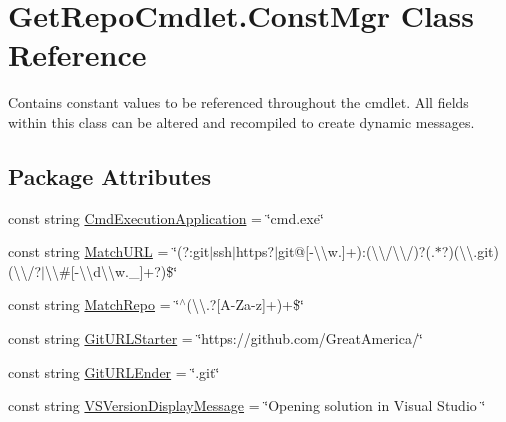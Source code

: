 \hypertarget{class_get_repo_cmdlet_1_1_const_mgr}{}\section{Get\+Repo\+Cmdlet.\+Const\+Mgr Class Reference}
\label{class_get_repo_cmdlet_1_1_const_mgr}


Contains constant values to be referenced throughout the cmdlet. All fields within this class can be altered and recompiled to create dynamic messages.  


\subsection*{Package Attributes}
\begin{DoxyCompactItemize}
\item 
const string \mbox{\hyperlink{class_get_repo_cmdlet_1_1_const_mgr_a11abb68978d0e05c4bfd7a4e3b14ddc0}{Cmd\+Execution\+Application}} = \char`\"{}cmd.\+exe\char`\"{}
\item 
const string \mbox{\hyperlink{class_get_repo_cmdlet_1_1_const_mgr_a1876b931d632dc2d3d193151e3afcf68}{Match\+U\+RL}} = \char`\"{}(?\+:git$\vert$ssh$\vert$https?$\vert$git@\mbox{[}-\/\textbackslash{}\textbackslash{}w.\mbox{]}+)\+:(\textbackslash{}\textbackslash{}/\textbackslash{}\textbackslash{}/)?(.$\ast$?)(\textbackslash{}\textbackslash{}.git)(\textbackslash{}\textbackslash{}/?$\vert$\textbackslash{}\textbackslash{}\#\mbox{[}-\/\textbackslash{}\textbackslash{}d\textbackslash{}\textbackslash{}w.\+\_\+\mbox{]}+?)\$\char`\"{}
\item 
const string \mbox{\hyperlink{class_get_repo_cmdlet_1_1_const_mgr_aff2f74429f9706613bd3e5bca85df4c9}{Match\+Repo}} = \char`\"{}$^\wedge$(\textbackslash{}\textbackslash{}.?\mbox{[}A-\/Za-\/z\mbox{]}+)+\$\char`\"{}
\item 
const string \mbox{\hyperlink{class_get_repo_cmdlet_1_1_const_mgr_adcd9d687565eb46487e0d468280bf6d4}{Git\+U\+R\+L\+Starter}} = \char`\"{}https\+://github.\+com/Great\+America/\char`\"{}
\item 
const string \mbox{\hyperlink{class_get_repo_cmdlet_1_1_const_mgr_ae28e609f323c8373cac4c139bded2c23}{Git\+U\+R\+L\+Ender}} = \char`\"{}.git\char`\"{}
\item 
const string \mbox{\hyperlink{class_get_repo_cmdlet_1_1_const_mgr_a31dd1e15462f9167c235c530003d6720}{V\+S\+Version\+Display\+Message}} = \char`\"{}Opening solution in Visual Studio \char`\"{}
\item 

\end{DoxyCompactItemize}
